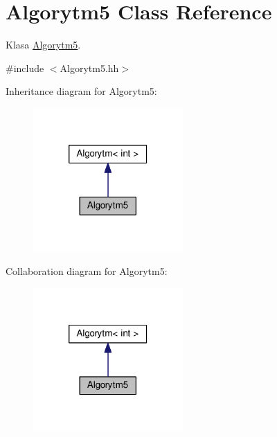 \hypertarget{a00006}{}\section{Algorytm5 Class Reference}
\label{a00006}


Klasa \hyperlink{a00006}{Algorytm5}.  




{\ttfamily \#include $<$Algorytm5.\+hh$>$}



Inheritance diagram for Algorytm5\+:
\nopagebreak
\begin{figure}[H]
\begin{center}
\leavevmode
\includegraphics[width=162pt]{a00116}
\end{center}
\end{figure}


Collaboration diagram for Algorytm5\+:
\nopagebreak
\begin{figure}[H]
\begin{center}
\leavevmode
\includegraphics[width=162pt]{a00117}
\end{center}
\end{figure}
